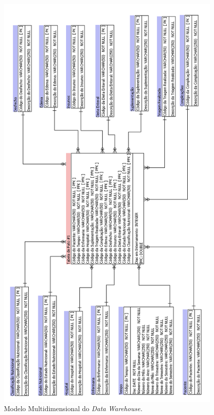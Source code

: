 \begin{figure}[htb]
	\caption{\label{fig_modelagemdatawarehouse}Modelo Multidimensional do \textit{Data Warehouse.}}
	\begin{center}
	    \includegraphics[scale=0.58]{Imagens/figura - modelagem multidimensional datawarehouse.png}
	\end{center}
\end{figure}

